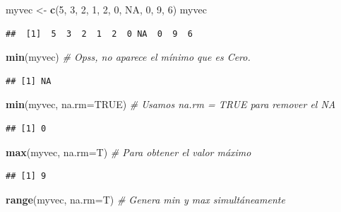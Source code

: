 \documentclass[10pt,]{krantz}
\makeatletter
\newenvironment{Shaded}{\begin{snugshade}}{\end{snugshade}}
\newcommand{\KeywordTok}[1]{\textcolor[rgb]{0.13,0.29,0.53}{\textbf{{#1}}}}
\newcommand{\DataTypeTok}[1]{\textcolor[rgb]{0.13,0.29,0.53}{{#1}}}
\newcommand{\DecValTok}[1]{\textcolor[rgb]{0.00,0.00,0.81}{{#1}}}
\newcommand{\StringTok}[1]{\textcolor[rgb]{0.31,0.60,0.02}{{#1}}}
\newcommand{\CommentTok}[1]{\textcolor[rgb]{0.56,0.35,0.01}{\textit{{#1}}}}
\newcommand{\OtherTok}[1]{\textcolor[rgb]{0.56,0.35,0.01}{{#1}}}
\newcommand{\NormalTok}[1]{{#1}}
\newenvironment{kframe}{%
\medskip{}
\setlength{\fboxsep}{.8em}
 \def\at@end@of@kframe{}%
 \ifinner\ifhmode%
  \def\at@end@of@kframe{\end{minipage}}%
  \begin{minipage}{\columnwidth}%
 \fi\fi%
 \def\FrameCommand##1{\hskip\@totalleftmargin \hskip-\fboxsep
 \colorbox{shadecolor}{##1}\hskip-\fboxsep
     \hskip-\linewidth \hskip-\@totalleftmargin \hskip\columnwidth}%
 \MakeFramed {\advance\hsize-\width
   \@totalleftmargin\z@ \linewidth\hsize
   \@setminipage}}%
 {\par\unskip\endMakeFramed%
 \at@end@of@kframe}
\renewenvironment{Shaded}{\begin{kframe}}{\end{kframe}}
\makeatother
\begin{document}
\begin{Shaded}
\begin{Highlighting}[]
\NormalTok{myvec <-}\StringTok{ }\KeywordTok{c}\NormalTok{(}\DecValTok{5}\NormalTok{, }\DecValTok{3}\NormalTok{, }\DecValTok{2}\NormalTok{, }\DecValTok{1}\NormalTok{, }\DecValTok{2}\NormalTok{, }\DecValTok{0}\NormalTok{, }\OtherTok{NA}\NormalTok{, }\DecValTok{0}\NormalTok{, }\DecValTok{9}\NormalTok{, }\DecValTok{6}\NormalTok{)}
\NormalTok{myvec}
\end{Highlighting}
\end{Shaded}

\begin{verbatim}
##  [1]  5  3  2  1  2  0 NA  0  9  6
\end{verbatim}

\begin{Shaded}
\begin{Highlighting}[]
\KeywordTok{min}\NormalTok{(myvec)  }\CommentTok{# Opss, no aparece el mínimo que es Cero.}
\end{Highlighting}
\end{Shaded}

\begin{verbatim}
## [1] NA
\end{verbatim}

\begin{Shaded}
\begin{Highlighting}[]
\KeywordTok{min}\NormalTok{(myvec, }\DataTypeTok{na.rm=}\OtherTok{TRUE}\NormalTok{)  }\CommentTok{# Usamos na.rm = TRUE para remover el NA}
\end{Highlighting}
\end{Shaded}

\begin{verbatim}
## [1] 0
\end{verbatim}

\begin{Shaded}
\begin{Highlighting}[]
\KeywordTok{max}\NormalTok{(myvec, }\DataTypeTok{na.rm=}\NormalTok{T)  }\CommentTok{# Para obtener el valor máximo}
\end{Highlighting}
\end{Shaded}

\begin{verbatim}
## [1] 9
\end{verbatim}

\begin{Shaded}
\begin{Highlighting}[]
\KeywordTok{range}\NormalTok{(myvec, }\DataTypeTok{na.rm=}\NormalTok{T)  }\CommentTok{# Genera min y max simultáneamente}
\end{Highlighting}
\end{Shaded}
\end{document}
